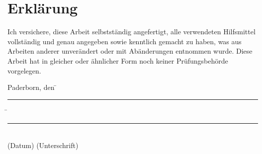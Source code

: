 \chapter*{Erklärung}
Ich versichere, diese Arbeit selbstständig angefertigt, alle verwendeten Hilfsmittel vollständig und genau angegeben sowie kenntlich gemacht zu haben, was aus Arbeiten anderer unverändert oder mit Abänderungen entnommen wurde.
Diese Arbeit hat in gleicher oder ähnlicher Form noch keiner Prüfungsbehörde vorgelegen.

\vspace{1cm}
\begin{tabbing}
    Paderborn, den\hspace{3mm}
        \= \rule[-0.15\baselineskip]{3cm}{.4pt} \hspace{3mm}
        \= \rule[-0.15\baselineskip]{6.3cm}{.4pt}\\
    \>\footnotesize{(Datum)}    \>\footnotesize{(Unterschrift)}
\end{tabbing}

